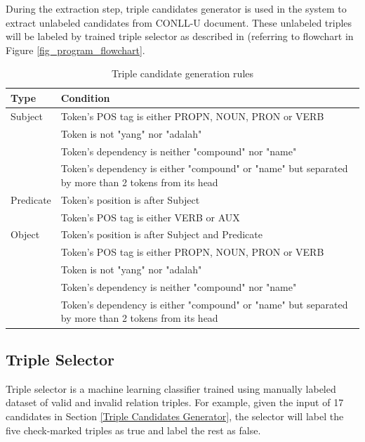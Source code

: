 \documentclass[peerreview,12pt]{IEEEtran}
\begin{document}
During the extraction step, triple candidates generator is used in the system to extract unlabeled candidates from CONLL-U document. These unlabeled triples will be labeled by trained triple selector as described in  (referring to flowchart in Figure \ref{fig_program_flowchart}.

\begin{table}[!t]
\renewcommand{\arraystretch}{1.5}
\caption{Triple candidate generation rules}
\label{table_triple_candidate_generation_rules}
\centering
\begin{tabular}{l p{6cm}}
\hline
\textbf{Type} & \textbf{Condition} \\
\hline
Subject & Token's POS tag is either PROPN, NOUN, PRON or VERB \\
\space & Token is not "yang" nor "adalah" \\
\space & Token's dependency is neither "compound" nor "name" \\
\space & Token's dependency is either "compound" or "name" but separated by more than 2 tokens from its head \\
\hline
Predicate & Token's position is after Subject \\
\space & Token's POS tag is either VERB or AUX \\
\hline
Object & Token's position is after Subject and Predicate \\
\space & Token's POS tag is either PROPN, NOUN, PRON or VERB \\
\space & Token is not "yang" nor "adalah" \\
\space & Token's dependency is neither "compound" nor "name" \\
\space & Token's dependency is either "compound" or "name" but separated by more than 2 tokens from its head \\
\end{tabular}
\end{table}


\subsection{Triple Selector}  \label{Triple Selector}

Triple selector is a machine learning classifier trained using manually labeled dataset of valid and invalid relation triples. For example, given the input of 17 candidates in Section \ref{Triple Candidates Generator}, the selector will label the five check-marked triples as true and label the rest as false.
\end{document}
